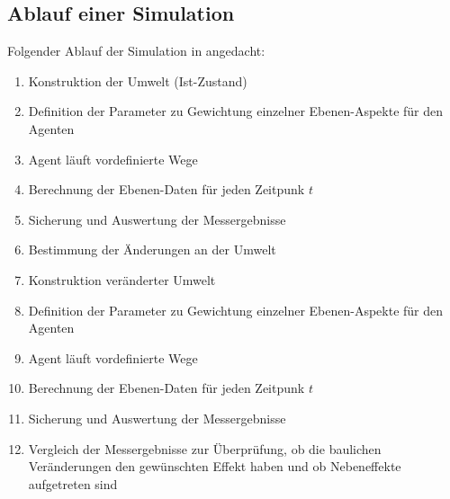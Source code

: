 \documentclass[10pt]{scrartcl}
\begin{document}
\subsection{Ablauf einer Simulation}
Folgender Ablauf der Simulation in angedacht:

\begin{enumerate}
\item Konstruktion der Umwelt (Ist-Zustand)
\item Definition der Parameter zu Gewichtung einzelner Ebenen-Aspekte für den Agenten
\item Agent läuft vordefinierte Wege
\item Berechnung der Ebenen-Daten für jeden Zeitpunk $t$
\item Sicherung und Auswertung der Messergebnisse
\item Bestimmung der Änderungen an der Umwelt
\item Konstruktion veränderter Umwelt
\item Definition der Parameter zu Gewichtung einzelner Ebenen-Aspekte für den Agenten
\item Agent läuft vordefinierte Wege
\item Berechnung der Ebenen-Daten für jeden Zeitpunk $t$
\item Sicherung und Auswertung der Messergebnisse
\item Vergleich der Messergebnisse zur Überprüfung, ob die baulichen Veränderungen den gewünschten Effekt haben und ob Nebeneffekte aufgetreten sind
\end{enumerate}
\end{document}
